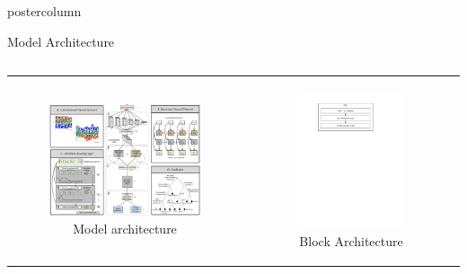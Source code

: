 ﻿\documentclass[final,hyperref={pdfpagelabels=false}]{beamer}
\begin{document}
\begin{frame}
\begin{columns}
\begin{column}{.49\paperwidth}
\begin{beamercolorbox}[center,wd=\textwidth]{postercolumn}
\begin{minipage}[T]{.99\textwidth}
{\begin{block}{Model Architecture}
\begin{columns}
\begin{column}{1\textwidth}
\begin{tabular}{|c|c|}
\hline
\begin{figure}
\includegraphics[width=0.5textwidth]{architecture}
 \caption{Model architecture}
\end{figure}  
& 
\begin{figure}[h]
	\centering
	\includegraphics[width=0.8\textwidth]{block}
	\caption{Block Architecture}
	\label{fig:block}
\end{figure}
\hline
\end{tabular}


\end{column}
\end{columns}
\end{block}}
\end{minipage}
\end{beamercolorbox}
\end{column}
\end{columns}
\end{frame}
\end{document}
